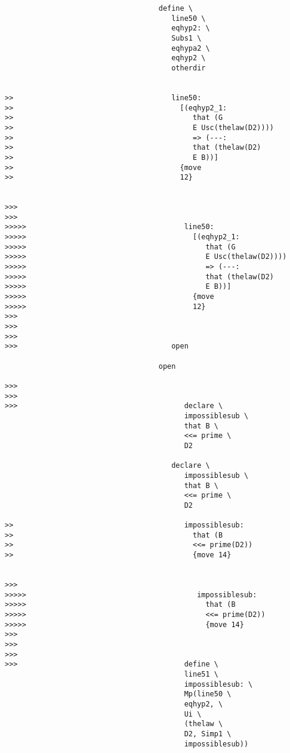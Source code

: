 \documentclass[12pt]{article}
\begin{document}
\begin{verbatim}
                                    define \
                                       line50 \
                                       eqhyp2: \
                                       Subs1 \
                                       eqhypa2 \
                                       eqhyp2 \
                                       otherdir


>>                                     line50:
>>                                       [(eqhyp2_1:
>>                                          that (G
>>                                          E Usc(thelaw(D2))))
>>                                          => (---:
>>                                          that (thelaw(D2)
>>                                          E B))]
>>                                       {move
>>                                       12}


>>>
>>>
>>>>>                                     line50:
>>>>>                                       [(eqhyp2_1:
>>>>>                                          that (G
>>>>>                                          E Usc(thelaw(D2))))
>>>>>                                          => (---:
>>>>>                                          that (thelaw(D2)
>>>>>                                          E B))]
>>>>>                                       {move
>>>>>                                       12}
>>>
>>>
>>>
>>>                                    open

                                    open

>>>
>>>
>>>                                       declare \
                                          impossiblesub \
                                          that B \
                                          <<= prime \
                                          D2

                                       declare \
                                          impossiblesub \
                                          that B \
                                          <<= prime \
                                          D2

>>                                        impossiblesub:
>>                                          that (B
>>                                          <<= prime(D2))
>>                                          {move 14}


>>>
>>>>>                                        impossiblesub:
>>>>>                                          that (B
>>>>>                                          <<= prime(D2))
>>>>>                                          {move 14}
>>>
>>>
>>>
>>>                                       define \
                                          line51 \
                                          impossiblesub: \
                                          Mp(line50 \
                                          eqhyp2, \
                                          Ui \
                                          (thelaw \
                                          D2, Simp1 \
                                          impossiblesub))


\end{verbatim}
\end{document}
